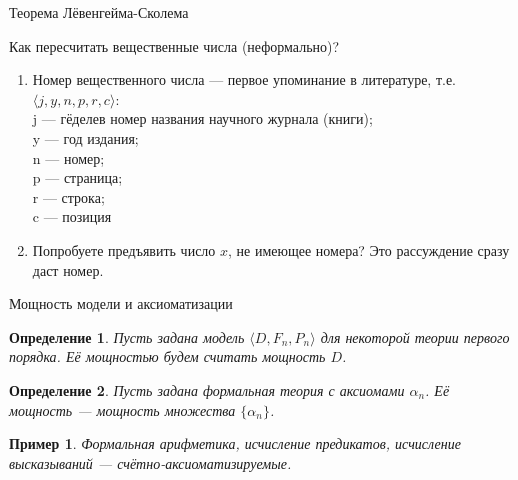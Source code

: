 \documentclass[aspectratio=169]{beamer}
\newtheorem{dfn}{Определение}[section]
\newtheorem{exm}{Пример}[section]
\begin{document}
\begin{frame}{}
\LARGE\begin{center}Теорема Лёвенгейма-Сколема\end{center}
\end{frame}

\begin{frame}{Как пересчитать вещественные числа (неформально)?}
\begin{enumerate}
\item Номер вещественного числа --- первое упоминание в литературе, т.е. $\langle j, y, n, p, r, c \rangle$:\\
j --- гёделев номер названия научного журнала (книги);\\
y --- год издания;\\
n --- номер;\\
p --- страница;\\
r --- строка;\\
c --- позиция\pause
\item Попробуете предъявить число $x$, не имеющее номера? Это рассуждение сразу даст номер.\\
\end{enumerate}
\end{frame}

\begin{frame}{Мощность модели и аксиоматизации}
\begin{dfn} Пусть задана модель $\langle D, F_n, P_n \rangle$ для некоторой теории первого порядка. 
Её мощностью будем считать мощность $D$.
\end{dfn}\pause

\begin{dfn} Пусть задана формальная теория с аксиомами $\alpha_n$. Её мощность --- мощность множества $\{\alpha_n\}$.
\end{dfn}\pause

\begin{exm} Формальная арифметика, исчисление предикатов, исчисление высказываний --- счётно-аксиоматизируемые.
\end{exm}
\end{frame}
\end{document}
